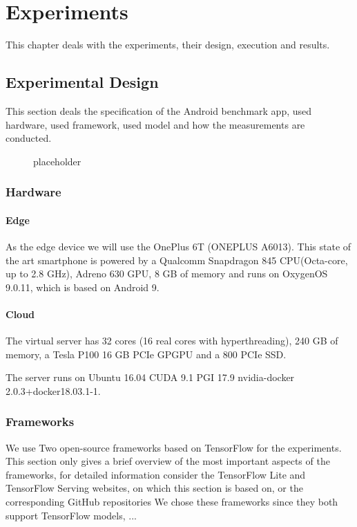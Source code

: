 \chapter{Experiments}
\label{chap:experiments}
This chapter deals with the experiments, their design, execution and results.

 
\section{Experimental Design}
This section deals the specification of the Android benchmark app, used hardware, used framework, used model and how the measurements are conducted. 
\begin{figure}[H]
\centering

\caption{placeholder}
\label{fig:cloud}
\end{figure}


\subsection{Hardware}
\subsubsection{Edge}
\label{chap:hardwareEdge}
As the edge device we will use the OnePlus 6T (ONEPLUS A6013). This state of the art smartphone is powered by a Qualcomm Snapdragon 845 CPU(Octa-core, up to 2.8 GHz), Adreno 630 GPU, 8 GB of memory and runs on OxygenOS 9.0.11, which is based on Android 9.
\subsubsection{Cloud}
The virtual server has 32 cores (16 real cores with hyperthreading), 240 GB of memory, a Tesla P100 16 GB PCIe GPGPU and a 800 PCIe SSD.

The server runs on Ubuntu 16.04 CUDA 9.1 PGI 17.9 nvidia-docker 2.0.3+docker18.03.1-1.
\subsection{Frameworks}
We use Two open-source frameworks based on TensorFlow for the experiments.
This section only gives a brief overview of the most important aspects of the frameworks, for detailed information consider the TensorFlow Lite\cite{tfLite}  and TensorFlow Serving\cite{tfServing} websites, on which this section is based on, or the corresponding GitHub repositories
We chose these frameworks since they both support TensorFlow models, ...%
